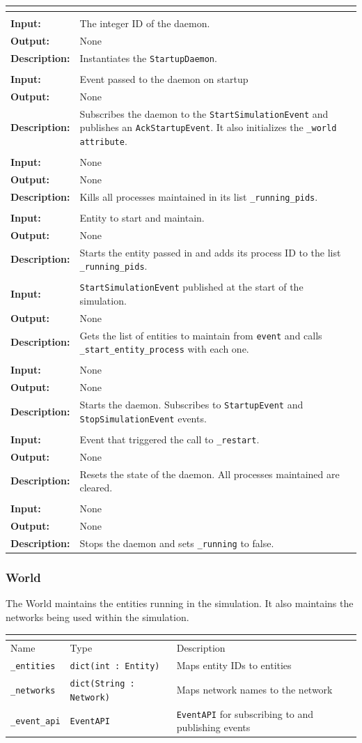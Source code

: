 \documentclass[titlepage]{article}
\newcommand{\operations}[1]{
\begin{center}
    \begin{longtable}{|p{4cm}|p{10cm + 2.0\tabcolsep}|}
    \hline
    \multicolumn{2}{|l|}{\cellcolor[gray]{0.5}{\textbf{Operations}}} \\ \hline
#1
    \end{longtable}
\end{center}
}
\newcommand{\operation}[4]{
    \hline
    \multicolumn{2}{|l|}{\cellcolor[gray]{0.8}{\texttt{#1}}} \\ \hline
    \hspace{7pt}\textbf{Input:} & #2 \\ \hline
    \hspace{7pt}\textbf{Output:} & #3 \\ \hline
    \hspace{7pt}\textbf{Description:} & #4 \\ \hline
}
\newcommand{\attributes}[1]{
    \begin{center}
        \begin{tabular}{|p{3cm}|p{3cm}|p{8cm}|}
            \multicolumn{3}{|l|}{\cellcolor[gray]{0.5}{\textbf{Attributes}}} \\ \hline
            \rowcolor[gray]{0.8} Name & Type & Description \\ \hline 
            #1
        \end{tabular}
    \end{center}
}
\newcommand{\attribute}[3]{
    \texttt{#1} & \texttt{#2} & #3 \\ \hline
}
\begin{document}
\operations{
    \operation{\_\_init\_\_(phys\_id)}{The integer ID of the daemon.}{None}{Instantiates the \texttt{StartupDaemon}.}
    \operation{\_on\_startup(event)}{Event passed to the daemon on startup}{None}{Subscribes the daemon to the \texttt{StartSimulationEvent} and publishes an \texttt{AckStartupEvent}. It also initializes the \texttt{\_world attribute}.}
    \operation{terminate\_all()}{None}{None}{Kills all processes maintained in its list \texttt{\_running\_pids}.}
    \operation{\_start\_entity\_processes(entity)}{Entity to start and maintain.}{None}{Starts the entity passed in and adds its process ID to the list \texttt{\_running\_pids}.}
    \operation{\_on\_sim\_start(event)}{\texttt{StartSimulationEvent} published at the start of the simulation.}{None}{Gets the list of entities to maintain from \texttt{event} and calls \texttt{\_start\_entity\_process} with each one.}
    \operation{start()}{None}{None}{Starts the daemon. Subscribes to \texttt{StartupEvent} and \texttt{StopSimulationEvent} events.}
    \operation{\_restart(event)}{Event that triggered the call to \texttt{\_restart}.}{None}{Resets the state of the daemon. All processes maintained are cleared.}
    \operation{stop()}{None}{None}{Stops the daemon and sets \texttt{\_running} to false.}
}

\subsubsection{World}
{The World maintains the entities running in the simulation. It also maintains the networks being used within the simulation.}

\attributes{
    \attribute{\_entities}{dict(int : Entity)}{Maps entity IDs to entities}
    \attribute{\_networks}{dict(String : Network)}{Maps network names to the network}
    \attribute{\_event\_api}{EventAPI}{\texttt{EventAPI} for subscribing to and publishing events}
}
\end{document}
